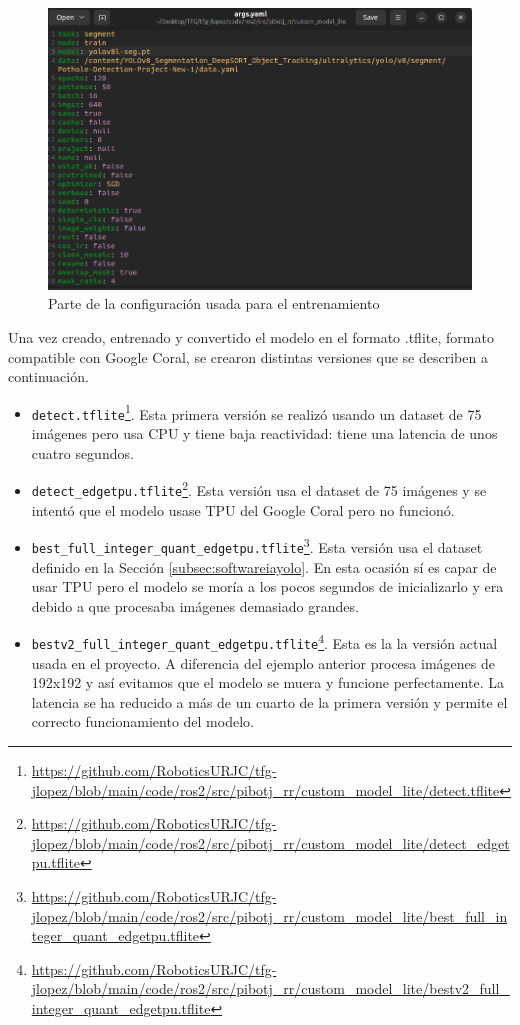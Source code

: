 \begin{figure} [h!]
	\begin{center}
		\includegraphics[width=12cm]{figs/cap7/args.png}
	\end{center}
	\caption{Parte de la configuración usada para el entrenamiento}
	\label{fig:configaa}
\end{figure}


Una vez creado, entrenado y convertido el modelo en el formato .tflite, formato compatible con Google Coral, se crearon distintas versiones que se describen a continuación.  
\begin{itemize}
	\item \verb|detect.tflite|\footnote{\url{https://github.com/RoboticsURJC/tfg-jlopez/blob/main/code/ros2/src/pibotj_rr/custom_model_lite/detect.tflite}}. Esta primera versión se realizó usando un dataset de 75 imágenes pero usa CPU y tiene baja reactividad: tiene una latencia de unos cuatro segundos.
	\item \verb|detect_edgetpu.tflite|\footnote{\url{https://github.com/RoboticsURJC/tfg-jlopez/blob/main/code/ros2/src/pibotj_rr/custom_model_lite/detect_edgetpu.tflite}}. Esta versión usa el dataset de 75 imágenes y se intentó que el modelo usase \ac{TPU} del Google Coral pero no funcionó.
	\item \verb|best_full_integer_quant_edgetpu.tflite|\footnote{\url{https://github.com/RoboticsURJC/tfg-jlopez/blob/main/code/ros2/src/pibotj_rr/custom_model_lite/best_full_integer_quant_edgetpu.tflite}}. Esta versión usa el dataset definido en la Sección \ref{subsec:softwareiayolo}. En esta ocasión sí es capar de usar \acs{TPU} pero el modelo se moría a los pocos segundos de inicializarlo y era debido a que procesaba imágenes demasiado grandes.
	\item \verb|bestv2_full_integer_quant_edgetpu.tflite|\footnote{\url{https://github.com/RoboticsURJC/tfg-jlopez/blob/main/code/ros2/src/pibotj_rr/custom_model_lite/bestv2_full_integer_quant_edgetpu.tflite}}. Esta es la la versión actual usada en el proyecto. A diferencia del ejemplo anterior procesa imágenes de 192x192 y así evitamos que el modelo se muera y funcione perfectamente. La latencia se ha reducido a más de un cuarto de la primera versión y permite el correcto funcionamiento del modelo.	
\end{itemize}


